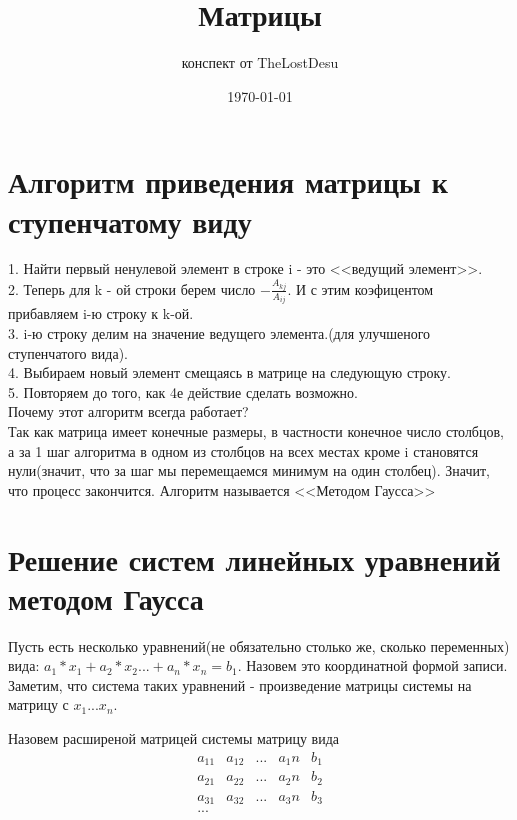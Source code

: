 \documentclass[a4paper,12pt]{article}
\author{конспект от TheLostDesu}
\title{Матрицы}
\date{\today}
\begin{document}
\maketitle
\section{Алгоритм приведения матрицы к ступенчатому виду}
1. Найти первый ненулевой элемент в строке i - это <<ведущий элемент>>.\\
2. Теперь для k - ой строки берем число $-\frac{A_{kj}}{A_{ij}}$. И с этим коэфицентом\\ прибавляем i-ю строку к k-ой.\\
3. i-ю строку делим на значение ведущего элемента.(для улучшеного ступенчатого вида).\\
4. Выбираем новый элемент смещаясь в матрице на следующую строку.\\
5. Повторяем до того, как 4е действие сделать возможно.\\

Почему этот алгоритм всегда работает?\\
Так как матрица имеет конечные размеры, в частности конечное число столбцов, а за 1 шаг алгоритма в одном из столбцов на всех местах кроме i становятся нули(значит, что за шаг мы перемещаемся минимум на один столбец). Значит, что процесс закончится. Алгоритм называется <<Методом Гаусса>>
\section{Решение систем линейных уравнений методом Гаусса}
Пусть есть несколько уравнений(не обязательно столько же, сколько переменных) вида:
$a_1 * x_1 + a_2 * x_2... + a_n * x_n = b_1$. Назовем это координатной формой записи. 
Заметим, что система таких уравнений - произведение матрицы системы на матрицу с $x_1...x_n$.

Назовем расширеной матрицей системы матрицу вида 
\[
\begin{matrix}
a_11  & a_12 & ... & a_1n & b_1\\
a_21  & a_22 & ... & a_2n & b_2\\
a_31  & a_32 & ... & a_3n & b_3\\
...
\end{matrix}
\]
\end{document}
